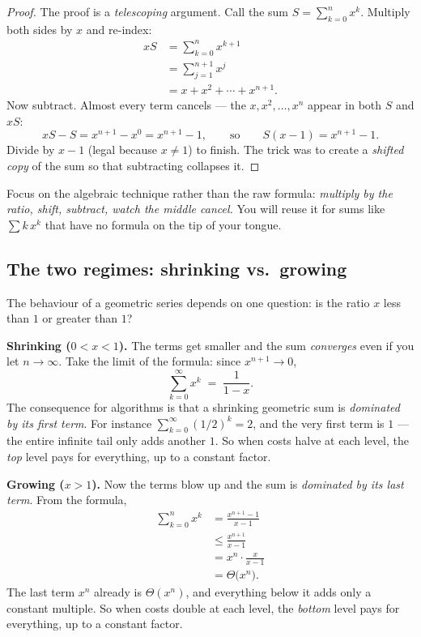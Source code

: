 \begin{proof}
The proof is a \emph{telescoping} argument. Call
the sum $S = \sum_{k=0}^{n} x^k$. Multiply both sides by $x$ and re-index:
\begin{align*}
  xS &= \sum_{k=0}^{n} x^{k+1} \\
     &= \sum_{j=1}^{n+1} x^{j} \\
     &= x + x^2 + \cdots + x^{n+1}.
\end{align*}
Now subtract. Almost every term cancels --- the $x, x^2, \dots, x^n$ appear in
both $S$ and $xS$:
\[
  xS - S = x^{n+1} - x^0 = x^{n+1} - 1,
  \qquad\text{so}\qquad
  S(x-1) = x^{n+1} - 1.
\]
Divide by $x - 1$ (legal because $x \neq 1$) to finish. The trick was to create a
\emph{shifted copy} of the sum so that subtracting collapses it.
\end{proof}

\begin{focusbox}
Focus on the algebraic technique rather than the raw formula: \emph{multiply by the ratio, shift,
subtract, watch the middle cancel.} You will reuse it for sums like
$\sum k\,x^k$ that have no formula on the tip of your tongue.
\end{focusbox}

\subsection{The two regimes: shrinking vs.\ growing}
\label{ch37:geo-regimes}

The behaviour of a geometric series depends on one question: is the ratio
$x$ less than $1$ or greater than $1$?

\textbf{Shrinking ($0 < x < 1$).} The terms get smaller and the sum
\emph{converges} even if you let $n \to \infty$. Take the limit of the formula:
since $x^{n+1} \to 0$,
\[
  \sum_{k=0}^{\infty} x^k \;=\; \frac{1}{1-x}.
\]
The consequence for algorithms is that a shrinking geometric sum is
\emph{dominated by its first term}. For instance
$\sum_{k=0}^{\infty} (1/2)^k = 2$, and the very first term is $1$ --- the entire
infinite tail only adds another $1$. So when costs halve at each level, the
\emph{top} level pays for everything, up to a constant factor.

\textbf{Growing ($x > 1$).} Now the terms blow up and the sum is
\emph{dominated by its last term}. From the formula,
\begin{align*}
  \sum_{k=0}^{n} x^k &= \frac{x^{n+1}-1}{x-1} \\
                     &\le \frac{x^{n+1}}{x-1} \\
                     &= x^{n}\cdot\frac{x}{x-1} \\
                     &= \Theta\bigl(x^{n}\bigr).
\end{align*}
The last term $x^n$ already is $\Theta(x^n)$, and everything below it adds only a
constant multiple. So when costs double at each level, the \emph{bottom} level
pays for everything, up to a constant factor.

